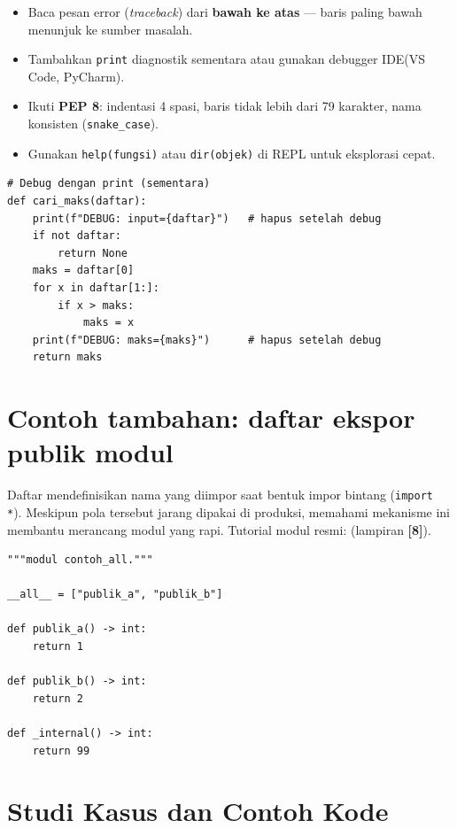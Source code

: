 \documentclass[../main.tex]{subfiles}
\begin{document}
\begin{itemize}[leftmargin=*]
  \item Baca pesan error (\textit{traceback}) dari \textbf{bawah ke atas} --- baris paling bawah menunjuk ke sumber masalah.
  \item Tambahkan \texttt{print} diagnostik sementara atau gunakan debugger IDE\newline (VS Code, PyCharm).
  \item Ikuti \textbf{PEP 8}: indentasi 4 spasi, baris tidak lebih dari 79 karakter, nama konsisten (\texttt{snake\_case}).
  \item Gunakan \texttt{help(fungsi)} atau \texttt{dir(objek)} di REPL untuk eksplorasi cepat.
\end{itemize}

\begin{lstlisting}[caption=Teknik debugging sederhana dengan print]
# Debug dengan print (sementara)
def cari_maks(daftar):
    print(f"DEBUG: input={daftar}")   # hapus setelah debug
    if not daftar:
        return None
    maks = daftar[0]
    for x in daftar[1:]:
        if x > maks:
            maks = x
    print(f"DEBUG: maks={maks}")      # hapus setelah debug
    return maks
\end{lstlisting}

\section{Contoh tambahan: daftar ekspor publik modul}

\noindent Daftar \texttt{} mendefinisikan nama yang diimpor saat bentuk impor bintang (\texttt{import *}). Meskipun pola tersebut jarang dipakai di produksi, memahami mekanisme ini membantu merancang modul yang rapi.\newline
Tutorial modul resmi:  (lampiran \textbf{[8]}).

\begin{lstlisting}[caption=Ekspor publik dengan dunder all]
"""modul contoh_all."""

__all__ = ["publik_a", "publik_b"]

def publik_a() -> int:
    return 1

def publik_b() -> int:
    return 2

def _internal() -> int:
    return 99
\end{lstlisting}

\section{Studi Kasus dan Contoh Kode}
\end{document}
